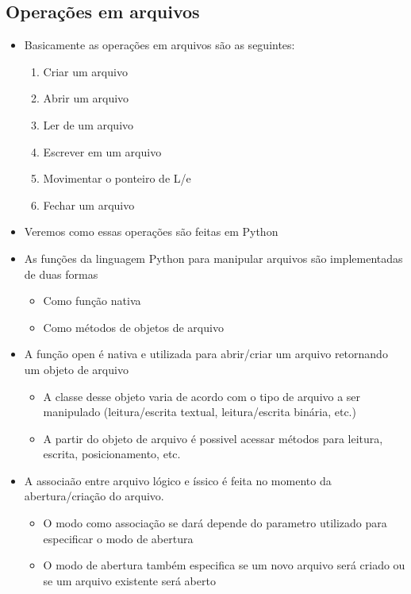 \documentclass[12pt]{article}
\begin{document}
    \subsection{Operações em arquivos}
    \begin{itemize}
        \item Basicamente as operações em arquivos são as seguintes:
        \begin{enumerate}[label=\arabic*.]
            \item Criar um arquivo
            \item Abrir um arquivo
            \item Ler de um arquivo
            \item Escrever em um arquivo
            \item Movimentar o ponteiro de L/e
            \item Fechar um arquivo
        \end{enumerate}
        \item Veremos como essas operações são feitas em Python
        \item As funções da linguagem Python para manipular arquivos são 
        implementadas de duas formas
        \begin{itemize}
            \item Como função nativa
            \item Como métodos de objetos de arquivo
        \end{itemize}
        \item A função open é nativa e utilizada para abrir/criar um arquivo 
        retornando um objeto de arquivo
        \begin{itemize}
            \item A classe desse objeto varia de acordo com o tipo de arquivo a 
            ser manipulado (leitura/escrita textual, leitura/escrita binária, 
            etc.)
            \item A partir do objeto de arquivo é possivel acessar métodos para 
            leitura, escrita, posicionamento, etc.
        \end{itemize}
        \item A associaão entre arquivo lógico e íssico é feita no momento da 
        abertura/criação do arquivo.
        \begin{itemize}
            \item O modo como associação se dará depende do parametro utilizado 
            para especificar o modo de abertura
            \item O modo de abertura também especifica se um novo arquivo será 
            criado ou se um arquivo existente será aberto
        \end{itemize}
    \end{itemize}
\end{document}
